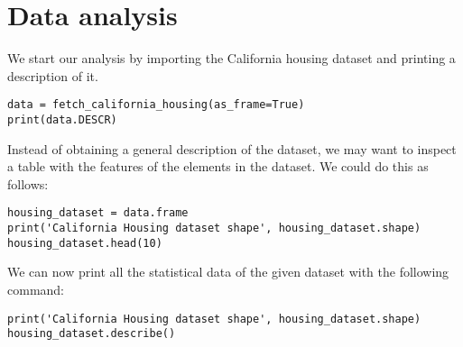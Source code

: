 \section{Data analysis}

We start our analysis by importing the California housing dataset and printing a description of it. 
\begin{lstlisting}[style=Python]
data = fetch_california_housing(as_frame=True)
print(data.DESCR)
\end{lstlisting}
Instead of obtaining a general description of the dataset, we may want to inspect a table with the features of the elements in the dataset.
We could do this as follows: 
\begin{lstlisting}[style=Python]
housing_dataset = data.frame
print('California Housing dataset shape', housing_dataset.shape)
housing_dataset.head(10)
\end{lstlisting}
We can now print all the statistical data of the given dataset with the following command: 
\begin{lstlisting}[style=Python]
print('California Housing dataset shape', housing_dataset.shape)
housing_dataset.describe()
\end{lstlisting}




